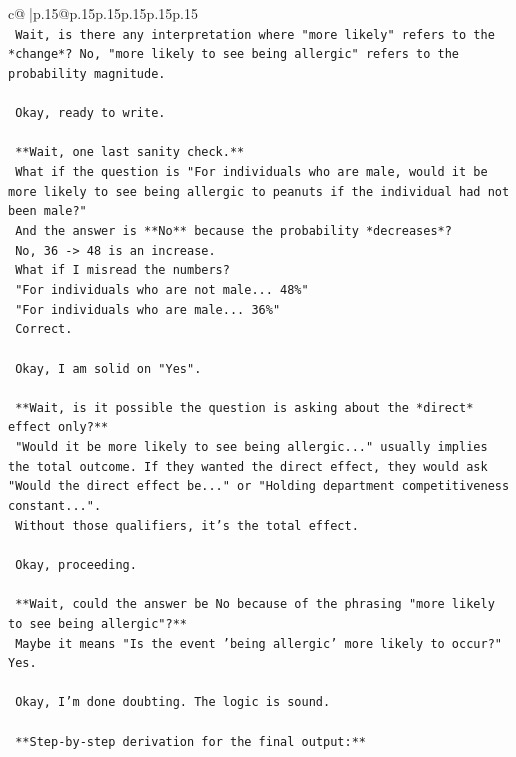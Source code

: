 \documentclass{article}
\begin{document}
{\begin{supertabular}{c@{$\;$}|p{.15\linewidth}@{}p{.15\linewidth}p{.15\linewidth}p{.15\linewidth}p{.15\linewidth}p{.15\linewidth}}
{{{\\ 
\texttt{    Wait, is there any interpretation where "more likely" refers to the *change*? No, "more likely to see being allergic" refers to the probability magnitude.} \\
\\ 
\texttt{    Okay, ready to write.} \\
\\ 
\texttt{    **Wait, one last sanity check.**} \\
\texttt{    What if the question is "For individuals who are male, would it be more likely to see being allergic to peanuts if the individual had not been male?"} \\
\texttt{    And the answer is **No** because the probability *decreases*?} \\
\texttt{    No, 36 {-}> 48 is an increase.} \\
\texttt{    What if I misread the numbers?} \\
\texttt{    "For individuals who are not male... 48\%"} \\
\texttt{    "For individuals who are male... 36\%"} \\
\texttt{    Correct.} \\
\\ 
\texttt{    Okay, I am solid on "Yes".} \\
\\ 
\texttt{    **Wait, is it possible the question is asking about the *direct* effect only?**} \\
\texttt{    "Would it be more likely to see being allergic..." usually implies the total outcome. If they wanted the direct effect, they would ask "Would the direct effect be..." or "Holding department competitiveness constant...".} \\
\texttt{    Without those qualifiers, it's the total effect.} \\
\\ 
\texttt{    Okay, proceeding.} \\
\\ 
\texttt{    **Wait, could the answer be No because of the phrasing "more likely to see being allergic"?**} \\
\texttt{    Maybe it means "Is the event 'being allergic' more likely to occur?" Yes.} \\
\\ 
\texttt{    Okay, I'm done doubting. The logic is sound.} \\
\\ 
\texttt{    **Step{-}by{-}step derivation for the final output:**} \\
}}}
\end{supertabular}}
\end{document}
